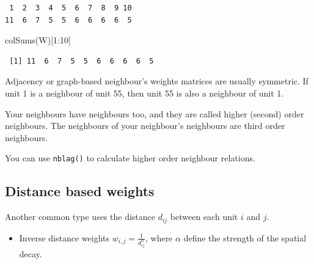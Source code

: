 \documentclass[
  letterpaper,
]{scrbook}
\newenvironment{Shaded}{\begin{snugshade}}{\end{snugshade}}
\newcommand{\DecValTok}[1]{\textcolor[rgb]{0.68,0.00,0.00}{#1}}
\newcommand{\FunctionTok}[1]{\textcolor[rgb]{0.28,0.35,0.67}{#1}}
\newcommand{\NormalTok}[1]{\textcolor[rgb]{0.00,0.23,0.31}{#1}}
\newcommand{\SpecialCharTok}[1]{\textcolor[rgb]{0.37,0.37,0.37}{#1}}
\providecommand{\tightlist}{%
  \setlength{\itemsep}{0pt}\setlength{\parskip}{0pt}}\usepackage{longtable,booktabs,array}
\begin{document}
\begin{verbatim}
 1  2  3  4  5  6  7  8  9 10 
11  6  7  5  5  6  6  6  6  5 
\end{verbatim}

\begin{Shaded}
\begin{Highlighting}[]
\FunctionTok{colSums}\NormalTok{(W)[}\DecValTok{1}\SpecialCharTok{:}\DecValTok{10}\NormalTok{]}
\end{Highlighting}
\end{Shaded}

\begin{verbatim}
 [1] 11  6  7  5  5  6  6  6  6  5
\end{verbatim}

Adjacency or graph-based neighbour's weights matrices are usually
symmetric. If unit 1 is a neighbour of unit 55, then unit 55 is also a
neighbour of unit 1.

\begin{tcolorbox}[enhanced jigsaw, colframe=quarto-callout-tip-color-frame, coltitle=black, titlerule=0mm, opacitybacktitle=0.6, toprule=.15mm, colbacktitle=quarto-callout-tip-color!10!white, toptitle=1mm, leftrule=.75mm, colback=white, bottomtitle=1mm, opacityback=0, left=2mm, title=\textcolor{quarto-callout-tip-color}{\faLightbulb}\hspace{0.5em}{Higher Order Neighbours}, breakable, arc=.35mm, rightrule=.15mm, bottomrule=.15mm]

Your neighbours have neighbours too, and they are called higher (second)
order neighbours. The neighbours of your neighbour's neighbours are
third order neighbours.

You can use \texttt{nblag()} to calculate higher order neighbour
relations.

\end{tcolorbox}

\hypertarget{distance-based-weights}{%
\subsection{Distance based weights}\label{distance-based-weights}}

Another common type uses the distance \(d_{ij}\) between each unit \(i\)
and \(j\).

\begin{itemize}
\tightlist
\item
  Inverse distance weights \(w_{i,j} = \frac{1}{d_{ij}^\alpha}\), where
  \(\alpha\) define the strength of the spatial decay.
\end{itemize}
\end{document}
